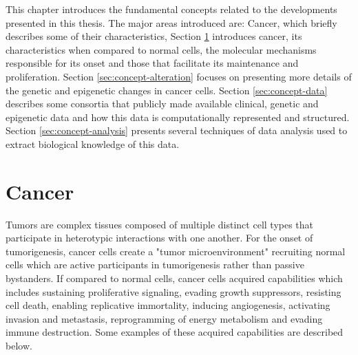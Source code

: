 This chapter introduces the fundamental concepts related to the developments presented in this thesis.
The major areas introduced are: Cancer, which briefly describes some of their characteristics,
Section \ref{sec:concept-cancer} introduces cancer, its characteristics when compared to normal cells,
the molecular mechanisms responsible for its onset and those that facilitate its maintenance and proliferation.
Section \ref{sec:concept-alteration} focuses on presenting more details of the genetic and
epigenetic changes in cancer cells.
Section \ref{sec:concept-data} describes some consortia that publicly made available clinical, genetic and epigenetic data
and how this data is computationally represented and structured.
Section \ref{sec:concept-analysis} presents several techniques of data analysis
used to extract biological knowledge of this data.

\section{Cancer} \label{sec:concept-cancer}

Tumors are complex tissues composed of multiple distinct cell types that participate in heterotypic interactions with one another. For the onset of tumorigenesis,  cancer cells create a "tumor microenvironment"
 recruiting normal cells which are active participants in tumorigenesis rather than passive bystanders.
If compared to normal cells, cancer cells acquired capabilities which includes sustaining proliferative signaling,
 evading growth suppressors, resisting cell death, enabling replicative immortality,
 inducing angiogenesis, activating invasion and metastasis, reprogramming of energy metabolism and
 evading immune destruction.  Some examples of these acquired capabilities are described below.

